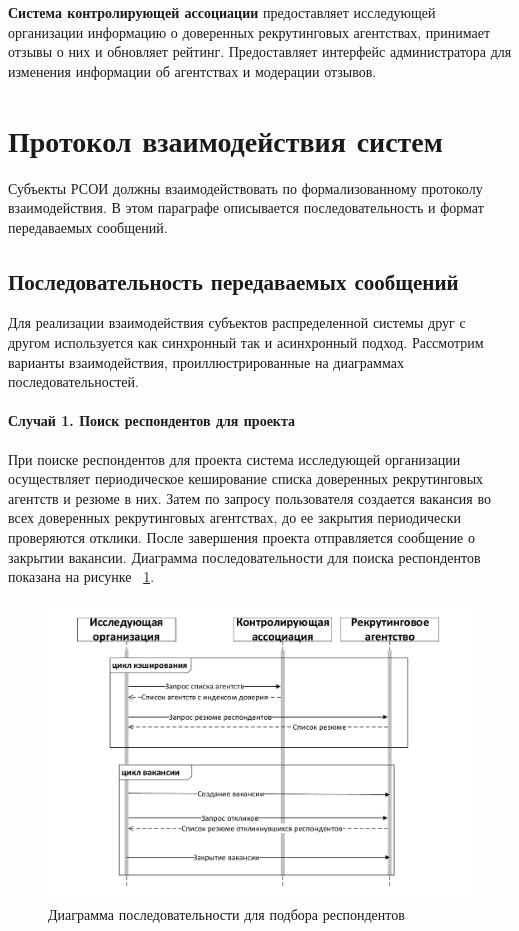 \textbf{Система контролирующей ассоциации} предоставляет исследующей организации информацию о доверенных рекрутинговых агентствах, принимает отзывы о них и обновляет рейтинг. Предоставляет интерфейс администратора для изменения информации об агентствах и модерации отзывов.

\section{Протокол взаимодействия систем} 
Субъекты РСОИ должны взаимодействовать по формализованному протоколу взаимодействия. В этом параграфе описывается последовательность и формат передаваемых сообщений. 

\subsection{Последовательность передаваемых сообщений}
Для реализации взаимодействия субъектов распределенной системы друг с другом используется как синхронный так и асинхронный подход. Рассмотрим варианты взаимодействия, проиллюстрированные на диаграммах последовательностей.

\paragraph{Случай 1. Поиск респондентов для проекта}

При поиске респондентов для проекта система исследующей организации осуществляет периодическое кеширование списка доверенных рекрутинговых агентств и резюме в них. Затем по запросу пользователя создается вакансия во всех доверенных рекрутинговых агентствах, до ее закрытия периодически проверяются отклики. После завершения проекта отправляется сообщение о закрытии вакансии.
Диаграмма последовательности для поиска респондентов показана на рисунке ~\ref{fig:sequence1}.
\begin{figure}[ht]
  \centering
  \includegraphics[width=\textwidth]{include/sequence1.pdf}
\caption{Диаграмма последовательности для подбора респондентов}
\label{fig:sequence1}
\end{figure}

